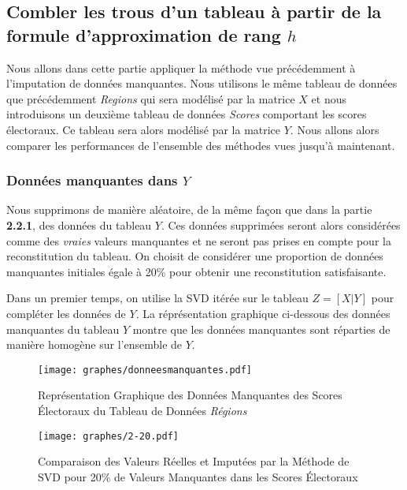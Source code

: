 \documentclass[12pt, openany, fleqn, french]{article}
\begin{document}
\newpage

\subsection{Combler les trous d'un tableau à partir de la formule d'approximation de rang $h$}

Nous allons dans cette partie appliquer la méthode vue précédemment à l'imputation de données manquantes. Nous utilisons le même tableau de données que précédemment \textit{Regions} qui sera modélisé par la matrice $X$ et nous introduisons un deuxième tableau de données \textit{Scores} comportant les scores électoraux. Ce tableau sera alors modélisé par la matrice $Y$. Nous allons alors comparer les performances de l'ensemble des méthodes vues jusqu'à maintenant. 

\subsubsection{Données manquantes dans $Y$}

Nous supprimons de manière aléatoire, de la même façon que dans la partie \textbf{2.2.1}, des données du tableau $Y$. Ces données supprimées seront alors considérées comme des \textit{vraies} valeurs manquantes et ne seront pas prises en compte pour la reconstitution du tableau. On choisit de considérer une proportion de données manquantes initiales égale à 20\% pour obtenir une reconstitution satisfaisante.

Dans un premier temps, on utilise la SVD itérée sur le tableau $Z=[X|Y]$ pour compléter les données de $Y$. La réprésentation graphique ci-dessous des données manquantes du tableau $Y$ montre que les données manquantes sont réparties de manière homogène sur l'ensemble de $Y$. 

\begin{center}
\begin{figure}[H]
\centering
  \texttt{[image: graphes/donneesmanquantes.pdf]}
  \caption{Représentation Graphique des Données Manquantes des Scores Électoraux du Tableau de Données \textit{Régions}}
\end{figure}
\end{center}

\begin{center}
\begin{figure}[H]
\centering
  \texttt{[image: graphes/2-20.pdf]}
  \caption{Comparaison des Valeurs Réelles et Imputées par la Méthode de SVD pour 20\% de Valeurs Manquantes dans les Scores Électoraux}
\end{figure}
\end{center}
\end{document}
